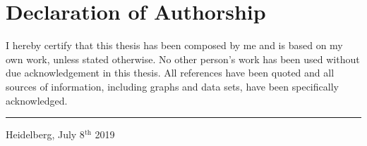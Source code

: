 \makeatletter
\chapter*{Declaration of Authorship}
I hereby certify that this thesis has been composed by me and is based on my own work, unless stated otherwise. No other person’s work has been used without due acknowledgement in this thesis. All references have been quoted and all sources of information, including graphs and data sets, have been specifically acknowledged.

\vspace{20mm} 

\hspace{80mm} \rule{60mm}{.15mm} \par
\hspace{80mm} \textbf{\@author} \par
\hspace{80mm} Heidelberg, July 8$^{\text{th}}$ 2019 
\makeatother
